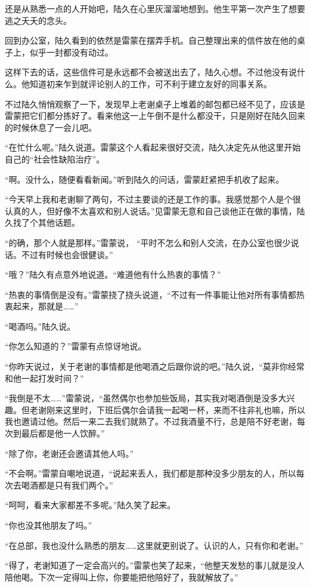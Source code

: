 还是从熟悉一点的人开始吧，陆久在心里灰溜溜地想到。他生平第一次产生了想要逃之夭夭的念头。

回到办公室，陆久看到的依然是雷蒙在摆弄手机。自己整理出来的信件放在他的桌子上，似乎一封都没有动过。

这样下去的话，这些信件可是永远都不会被送出去了，陆久心想。不过他没有说什么。他知道初来乍到就评论别人的工作，可不利于建立友好的同事关系。

不过陆久悄悄观察了一下，发现早上老谢桌子上堆着的邮包都已经不见了，应该是雷蒙把它们都分拣好了。看来他这一上午倒不是什么都没干，只是刚好在陆久回来的时候休息了一会儿吧。

“在忙什么呢。”陆久说道。雷蒙这个人看起来很好交流，陆久决定先从他这里开始自己的“社会性缺陷治疗”。

“啊。没什么，随便看看新闻。”听到陆久的问话，雷蒙赶紧把手机收了起来。

“今天早上我和老谢聊了两句，不过主要谈的还是工作的事。我感觉那个人是个很认真的人，但好像不太喜欢和别人说话。”见雷蒙无意和自己谈他正在做的事情，陆久找了个其他话题。

“的确，那个人就是那样。”雷蒙说， “平时不怎么和别人交流，在办公室也很少说话。不过有时候也会很健谈。”

“哦？”陆久有点意外地说道。“难道他有什么热衷的事情？”

“热衷的事情倒是没有。”雷蒙挠了挠头说道，“不过有一件事能让他对所有事情都热衷起来，那就是……”

“喝酒吗。”陆久说。

“你怎么知道的？”雷蒙有点惊讶地说。

“你昨天说过，关于老谢的事情都是他喝酒之后跟你说的吧。”陆久说，“莫非你经常和他一起打发时间？”

“我倒是不太……”雷蒙说，“虽然偶尔也参加些饭局，其实我对喝酒倒是没多大兴趣。但老谢刚来这里时，下班后偶尔会请我一起喝一杯，来而不往非礼也嘛，所以我也邀请过他。然后一来二去我们就熟了。不过我酒量不行，总是陪不好老谢，每次到最后都是他一人饮醉。”

“除了你，老谢还会邀请其他人吗。”

“不会啊。”雷蒙自嘲地说道，“说起来丢人，我们都是那种没多少朋友的人，所以每次去喝酒都是只有我们两个。”

“呵呵，看来大家都差不多呢。”陆久笑了起来。

“你也没其他朋友了吗。”

“在总部，我也没什么熟悉的朋友……这里就更别说了。认识的人，只有你和老谢。”

“得了，老谢知道了一定会高兴的。”雷蒙也笑了起来，“他整天发愁的事儿就是没人陪他喝。下次一定得叫上你，你要能把他陪好了，我就解放了。”

